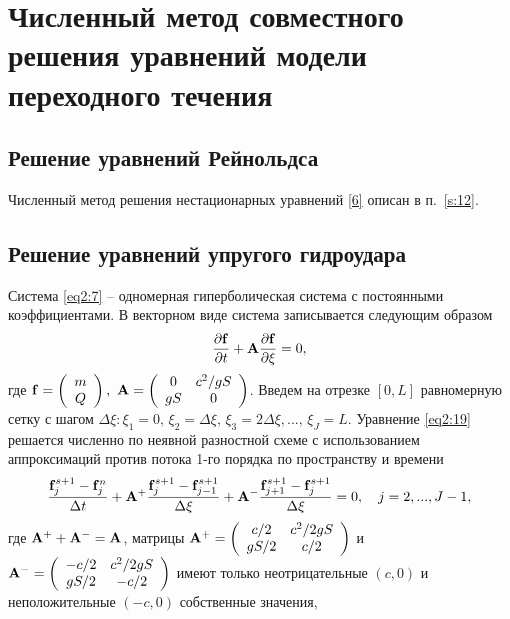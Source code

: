 \section{Численный метод совместного решения уравнений модели переходного течения}
\label{s:23}
\subsection{Решение уравнений Рейнольдса}
Численный метод решения нестационарных уравнений \eqref{6} описан в п.~\ref{s:12}.

\subsection{Решение уравнений упругого гидроудара}
Система \eqref{eq2:7} -- одномерная гиперболическая система с постоянными коэффициентами. В векторном виде 
система записывается следующим образом
\begin{equation}
  \label{eq2:19} 
  \frac{{\partial {\bf{f}}}}{{\partial t}} +{\bf{A}}
  \frac{{\partial {\bf{f}}}}{{\partial \xi}} = 0,
\end{equation}
где ${\bf{f}} = \left( {\begin{array}{*{20}c} m \\ Q \\ \end{array}}\right),\ 
{\bf{A}} = \left( {\begin{array}{*{20}c} 0 & {c^2 /gS}  \\ {gS} & 0 \\ \end{array}} \right)$. Введем на отрезке
 $[0,L]$ равномерную сетку с шагом $\Delta \xi: \xi_1=0,\,\xi_2=\Delta \xi,\,\xi_3=2\Delta \xi,...,\,\xi_J=L.$
Уравнение \eqref{eq2:19} решается численно по неявной разностной схеме с использованием аппроксимаций против 
потока 1-го порядка по пространству и времени
\begin{equation}
  \label{eq2:20} 
  \frac{{{\bf{f}}_j^{s+1}  - {\bf{f}}_j^n }}{{\Delta t}} + {\bf{A}}^ +  \frac{{{\bf{f}}_j^{s+1} - 
  {\bf{f}}_{j - 1}^{s+1} }}{{\Delta \xi}} + {\bf{A}}^ -  
  \frac{{{\bf{f}}_{j + 1}^{s+1} - {\bf{f}}_j^{s+1} }}{{\Delta \xi}} = 0,\quad j=2,...,J-1,
\end{equation}
где ${\bf{A}}^+ +{\bf{A}}^-={\bf{A}}$, матрицы ${\bf{A}}^+=\left( {
\begin{array}{*{20}c}
   {c/2} & {c^2 /2gS}  \\
   {gS/2} & {c/2}  \\
\end{array}} \right)$ и ${\bf{A}}^-= \left( {\begin{array}{*{20}c}
   { - c/2} & {c^2 /2gS}  \\
   {gS/2} & { - c/2}  \\
\end{array}} \right)$ имеют только неотрицательные $(c,0)$ и неположительные $(-c,0)$ собственные значения, 
